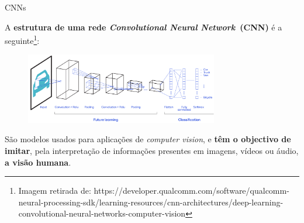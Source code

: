 \begin{frame}{CNNs}

A \textbf{estrutura de uma rede \textit{Convolutional Neural Network}~(CNN)} é a seguinte\footnote{\tiny{Imagem retirada de: https://developer.qualcomm.com/software/qualcomm-neural-processing-sdk/learning-resources/cnn-architectures/deep-learning-convolutional-neural-networks-computer-vision}}:

\begin{figure}
    \centering
    \includegraphics[width=0.75\textwidth]{img/CNN.png}
\end{figure}

São modelos usados para aplicações de \textit{computer vision}, e \textbf{têm o objectivo de imitar}, pela interpretação de informações presentes em imagens, vídeos ou áudio, \textbf{a visão humana}.

\end{frame}

